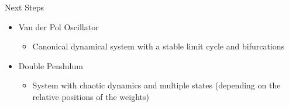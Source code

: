 \documentclass{beamer}
\begin{document}
\begin{frame}{Next Steps}
        \begin{itemize}
            \item Van der Pol Oscillator
            \begin{itemize}
                \item Canonical dynamical system with a stable limit cycle and bifurcations
            \end{itemize}

            \vspace{2em}

            \item Double Pendulum
            \begin{itemize}
                \item System with chaotic dynamics and multiple states (depending on the relative positions of the weights)
            \end{itemize}

        \end{itemize}

    \end{frame}
\end{document}
